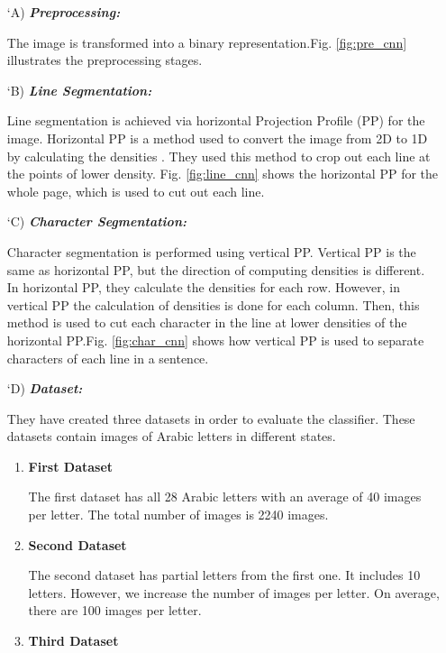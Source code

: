 \begin{itemize}[labelindent=1em,labelsep=0.25cm,leftmargin=*]
        \item[\char `A)] \textit{\textbf{Preprocessing:}} 
        
        The image is transformed into a binary representation.Fig. \ref{fig:pre_cnn} illustrates the preprocessing stages.
        
        \item[\char `B)] \textit{\textbf{Line Segmentation:}}  
        
        Line segmentation is achieved via horizontal Projection Profile (PP) for the image. Horizontal PP is a method used to convert the image from 2D to 1D by calculating the densities \cite{PP}. They used this method to crop out each line at the points of lower density. Fig. \ref{fig:line_cnn} shows the horizontal PP for the whole page, which is used to cut out each line.
        
        \item[\char `C)] \textit{\textbf{Character Segmentation:}} 
        
        Character segmentation is performed using vertical PP. Vertical PP is the same as horizontal PP, but the direction of computing densities is different. In horizontal PP, they calculate the densities for each row. However, in vertical PP the calculation of densities is done for each column. Then, this method is used to cut each character in the line at lower densities of the horizontal PP.Fig. \ref{fig:char_cnn} shows how vertical PP is used to  separate characters of each line in a sentence.
        
        \item[\char `D)] \textit{\textbf{Dataset:}}
        
        They have created three datasets in order to evaluate the classifier. These datasets contain images of Arabic letters in different states.
        
        \begin{enumerate}
        \item {\textbf{First Dataset}}
        
        The first dataset has all 28 Arabic letters with an average of 40 images per letter. The total number of images is 2240 images.
        \item {\textbf{Second Dataset}}
        
        The second dataset has partial letters from the first one. It includes 10 letters. However, we increase the number of images per letter. On average, there are 100 images per letter.
        \item {\textbf{Third Dataset}} 
        

\end{enumerate}
\end{itemize}
